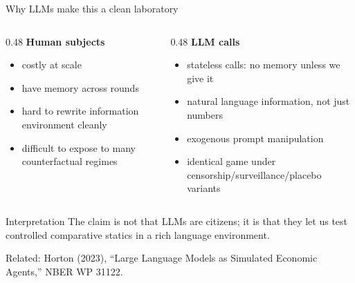 \documentclass[aspectratio=169,12pt]{beamer}
\begin{document}
\begin{frame}{Why LLMs make this a clean laboratory}
  \begin{columns}[T]
    \begin{column}{0.48\textwidth}
      \textbf{Human subjects}
      \begin{itemize}\setlength\itemsep{0.25em}
        \item costly at scale
        \item have memory across rounds
        \item hard to rewrite information environment cleanly
        \item difficult to expose to many counterfactual regimes
      \end{itemize}
    \end{column}
    \begin{column}{0.48\textwidth}
      \textbf{LLM calls}
      \begin{itemize}\setlength\itemsep{0.25em}
        \item stateless calls: no memory unless we give it
        \item natural language information, not just numbers
        \item exogenous prompt manipulation
        \item identical game under censorship/surveillance/placebo variants
      \end{itemize}
    \end{column}
  \end{columns}

  \medskip
  \begin{alertblock}{Interpretation}
    \small
    The claim is not that LLMs are citizens; it is that they let us test controlled comparative statics in a rich language environment.
  \end{alertblock}

  \vspace{-0.15cm}
  {\tiny\color{muted}Related: Horton (2023), ``Large Language Models as Simulated Economic Agents,'' NBER WP 31122.}
\end{frame}
\end{document}
